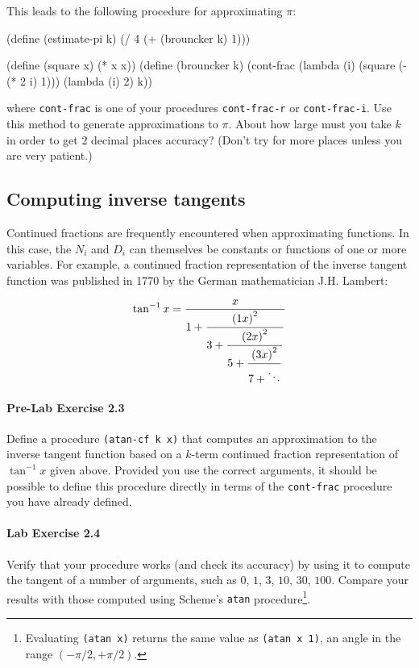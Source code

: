 This leads to the following procedure for approximating $\pi$:

\beginlisp
(define (estimate-pi k)
  (/ 4 (+ (brouncker k) 1)))
\endlisp

\beginlisp
(define (square x) (* x x))
\null
(define (brouncker k)
  (cont-frac (lambda (i) (square (- (* 2 i) 1)))
             (lambda (i) 2)
             k))
\endlisp

where {\tt cont-frac} is one of your procedures {\tt cont-frac-r} or
{\tt cont-frac-i}.  Use this method to generate approximations to $\pi$.
About how large must you take $k$ in order to get 2 decimal places
accuracy?  (Don't try for more places unless you are very patient.)

\subsection{Computing inverse tangents}

Continued fractions are frequently encountered when approximating
functions.  In this case, the $N_i$ and $D_i$ can themselves be
constants or functions of one or more variables.  For example, a
continued fraction representation of the inverse tangent function
was published in 1770 by the German mathematician J.H. Lambert:

\begin{displaymath}
{\tan^{-1}x} ={x \over
{\displaystyle 1+{\strut {\left( {1x} \right)^2} \over
{\displaystyle 3+{\strut {\left( {2x} \right)^2} \over
{\displaystyle 5+{\strut {\left( {3x} \right)^2} \over {7+\ddots }}}}}}}}
\end{displaymath}

\paragraph{Pre-Lab Exercise 2.3}
Define a procedure {\tt (atan-cf k x)} that computes an approximation
to the inverse tangent function based on a $k$-term continued fraction
representation of $\tan^{-1} x$ given above. Provided you use the
correct arguments, it should be possible to
define this procedure directly in terms of the {\tt cont-frac}
procedure you have already defined.

\paragraph{Lab Exercise 2.4}
Verify that your
procedure works (and check its accuracy) by using it to compute the
tangent of a number of arguments, such as $0$,
$1$, $3$, $10$, $30$, $100$.
Compare your results with those computed using
Scheme's {\tt atan} procedure\footnote{Evaluating {\tt (atan x)}
returns the same value as {\tt (atan x 1)}, an angle in the range
$(-\pi/2, +\pi/2)$.}.


